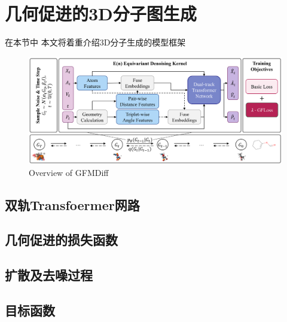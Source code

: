 \chapter[几何促进的3D分子图生成]{几何促进的3D分子图生成}
\label{chap:gfmdiff}

在本节中 本文将着重介绍3D分子生成的模型框架

\begin{figure}[h]
    \centering
    \includegraphics[width=\linewidth]{figures/overview_gfmdiff.png}
    \caption{Overview of GFMDiff}
    \label{fig:gfmdiff}
  \end{figure}


\section{双轨Transfoermer网路}

\section{几何促进的损失函数}

\section{扩散及去噪过程}

\section{目标函数}